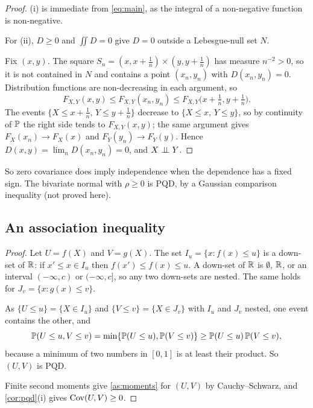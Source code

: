 \documentclass{saim-blog}
\begin{document}
\begin{proof}
(i) is immediate from \eqref{eq:main}, as the integral of a non-negative function is non-negative.

For (ii), $D\ge0$ and $\iint D=0$ give $D=0$ outside a Lebesgue-null set $N$.

Fix $(x,y)$. The square $S_n=(x,x+\tfrac1n)\times(y,y+\tfrac1n)$ has measure $n^{-2}>0$, so it is not contained in $N$ and contains a point $(x_n,y_n)$ with $D(x_n,y_n)=0$. Distribution functions are non-decreasing in each argument, so
\[
F_{X,Y}(x,y)\le F_{X,Y}(x_n,y_n)\le F_{X,Y}\big(x+\tfrac1n,y+\tfrac1n\big).
\]
The events $\{X\le x+\tfrac1n,\,Y\le y+\tfrac1n\}$ decrease to $\{X\le x,\,Y\le y\}$, so by continuity of $\mathbb{P}$ the right side tends to $F_{X,Y}(x,y)$; the same argument gives $F_X(x_n)\to F_X(x)$ and $F_Y(y_n)\to F_Y(y)$. Hence $D(x,y)=\lim_n D(x_n,y_n)=0$, and $X\mathrel{\perp\!\!\!\perp} Y$.
\end{proof}
So zero covariance does imply independence when the dependence has a fixed sign. The bivariate normal with $\rho\ge0$ is PQD, by a Gaussian comparison inequality \citep{slepian1962} (not proved here).

\subsection{An association inequality}
\begin{proof}
Let $U=f(X)$ and $V=g(X)$. The set $I_u=\{x:f(x)\le u\}$ is a down-set of $\mathbb{R}$: if $x'\le x\in I_u$ then $f(x')\le f(x)\le u$. A down-set of $\mathbb{R}$ is $\emptyset$, $\mathbb{R}$, or an interval $(-\infty,c)$ or $(-\infty,c]$, so any two down-sets are nested. The same holds for $J_v=\{x:g(x)\le v\}$.

As $\{U\le u\}=\{X\in I_u\}$ and $\{V\le v\}=\{X\in J_v\}$ with $I_u$ and $J_v$ nested, one event contains the other, and
\[
\mathbb{P}(U\le u,V\le v)=\min\{\mathbb{P}(U\le u),\mathbb{P}(V\le v)\}\ge\mathbb{P}(U\le u)\,\mathbb{P}(V\le v),
\]
because a minimum of two numbers in $[0,1]$ is at least their product. So $(U,V)$ is PQD.

Finite second moments give \cref{as:moments} for $(U,V)$ by Cauchy--Schwarz, and \cref{cor:pqd}(i) gives $\operatorname{Cov}(U,V)\ge0$.
\end{proof}
\end{document}
